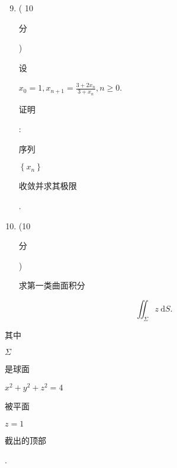 \documentclass[10pt]{article}
\begin{document}
\begin{enumerate}
  \setcounter{enumi}{8}
  \item ( 10 \begin{CJK}{UTF8}{mj}分\end{CJK}) \begin{CJK}{UTF8}{mj}设\end{CJK} $x_{0}=1, x_{n+1}=\frac{3+2 x_{n}}{3+x_{n}}, n \geq 0$. \begin{CJK}{UTF8}{mj}证明\end{CJK}: \begin{CJK}{UTF8}{mj}序列\end{CJK} $\left\{x_{n}\right\}$ \begin{CJK}{UTF8}{mj}收敛并求其极限\end{CJK}.

  \item (10 \begin{CJK}{UTF8}{mj}分\end{CJK}) \begin{CJK}{UTF8}{mj}求第一类曲面积分\end{CJK}

\end{enumerate}
$$
\iint_{\Sigma} z \mathrm{~d} S .
$$
\begin{CJK}{UTF8}{mj}其中\end{CJK} $\Sigma$ \begin{CJK}{UTF8}{mj}是球面\end{CJK} $x^{2}+y^{2}+z^{2}=4$ \begin{CJK}{UTF8}{mj}被平面\end{CJK} $z=1$ \begin{CJK}{UTF8}{mj}截出的顶部\end{CJK}.
\end{document}
